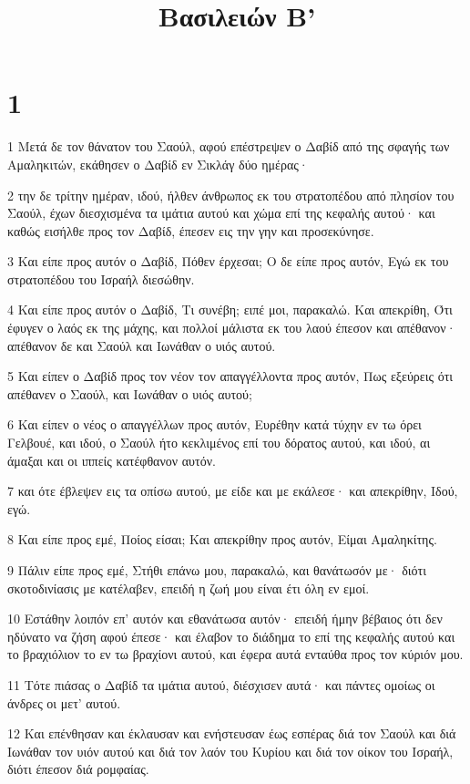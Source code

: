 

\title{Βασιλειών Β'}


\chapter{1}

\par 1 Μετά δε τον θάνατον του Σαούλ, αφού επέστρεψεν ο Δαβίδ από της σφαγής των Αμαληκιτών, εκάθησεν ο Δαβίδ εν Σικλάγ δύο ημέρας·
\par 2 την δε τρίτην ημέραν, ιδού, ήλθεν άνθρωπος εκ του στρατοπέδου από πλησίον του Σαούλ, έχων διεσχισμένα τα ιμάτια αυτού και χώμα επί της κεφαλής αυτού· και καθώς εισήλθε προς τον Δαβίδ, έπεσεν εις την γην και προσεκύνησε.
\par 3 Και είπε προς αυτόν ο Δαβίδ, Πόθεν έρχεσαι; Ο δε είπε προς αυτόν, Εγώ εκ του στρατοπέδου του Ισραήλ διεσώθην.
\par 4 Και είπε προς αυτόν ο Δαβίδ, Τι συνέβη; ειπέ μοι, παρακαλώ. Και απεκρίθη, Ότι έφυγεν ο λαός εκ της μάχης, και πολλοί μάλιστα εκ του λαού έπεσον και απέθανον· απέθανον δε και Σαούλ και Ιωνάθαν ο υιός αυτού.
\par 5 Και είπεν ο Δαβίδ προς τον νέον τον απαγγέλλοντα προς αυτόν, Πως εξεύρεις ότι απέθανεν ο Σαούλ, και Ιωνάθαν ο υιός αυτού;
\par 6 Και είπεν ο νέος ο απαγγέλλων προς αυτόν, Ευρέθην κατά τύχην εν τω όρει Γελβουέ, και ιδού, ο Σαούλ ήτο κεκλιμένος επί του δόρατος αυτού, και ιδού, αι άμαξαι και οι ιππείς κατέφθανον αυτόν.
\par 7 και ότε έβλεψεν εις τα οπίσω αυτού, με είδε και με εκάλεσε· και απεκρίθην, Ιδού, εγώ.
\par 8 Και είπε προς εμέ, Ποίος είσαι; Και απεκρίθην προς αυτόν, Είμαι Αμαληκίτης.
\par 9 Πάλιν είπε προς εμέ, Στήθι επάνω μου, παρακαλώ, και θανάτωσόν με· διότι σκοτοδινίασις με κατέλαβεν, επειδή η ζωή μου είναι έτι όλη εν εμοί.
\par 10 Εστάθην λοιπόν επ' αυτόν και εθανάτωσα αυτόν· επειδή ήμην βέβαιος ότι δεν ηδύνατο να ζήση αφού έπεσε· και έλαβον το διάδημα το επί της κεφαλής αυτού και το βραχιόλιον το εν τω βραχίονι αυτού, και έφερα αυτά ενταύθα προς τον κύριόν μου.
\par 11 Τότε πιάσας ο Δαβίδ τα ιμάτια αυτού, διέσχισεν αυτά· και πάντες ομοίως οι άνδρες οι μετ' αυτού.
\par 12 Και επένθησαν και έκλαυσαν και ενήστευσαν έως εσπέρας διά τον Σαούλ και διά Ιωνάθαν τον υιόν αυτού και διά τον λαόν του Κυρίου και διά τον οίκον του Ισραήλ, διότι έπεσον διά ρομφαίας.
